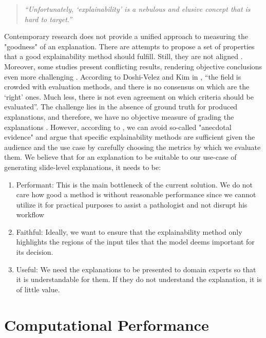 \begin{quote}
    \emph{``Unfortunately, `explainability' is a nebulous and elusive concept that is hard to target.''} \cite{explainability-hard}
\end{quote}

Contemporary research does not provide a unified approach to measuring the "goodness" of an explanation.
There are attempts to propose a set of properties that a good explainability method should fulfill. Still, they are not aligned \cite{xai-functionality-grounded, explainability-hard, xai-meta-survey, xai-zhou-survey}.
Moreover, some studies present conflicting results, rendering objective conclusions even more challenging \cite{xai-zhou-survey}.
According to Doshi-Velez and Kim in \cite{xai-doshi}, ``the field is crowded with evaluation methods, and there is no consensus on which are the `right' ones. 
Much less, there is not even agreement on which criteria should be evaluated''.
The challenge lies in the absence of ground truth for produced explanations, and therefore, we have no objective measure of grading the explanations \cite{xai-zhou-survey}.
However, according to \cite{xai-anecdotal-evidence}, we can avoid so-called "anecdotal evidence" and argue that specific explainability methods are sufficient given the audience and the use case by carefully choosing the metrics by which we evaluate them.
We believe that for an explanation to be suitable to our use-case of generating slide-level explanations, it needs to be:
\begin{enumerate}
    \item Performant: This is the main bottleneck of the current solution. We do not care how good a method is without reasonable performance since we cannot utilize it for practical purposes to assist a pathologist and not disrupt his workflow
    \item Faithful: Ideally, we want to ensure that the explainability method only highlights the regions of the input tiles that the model deems important for its decision.
    \item Useful: We need the explanations to be presented to domain experts so that it is understandable for them. If they do not understand the explanation, it is of little value. 
\end{enumerate}

\section{Computational Performance}

